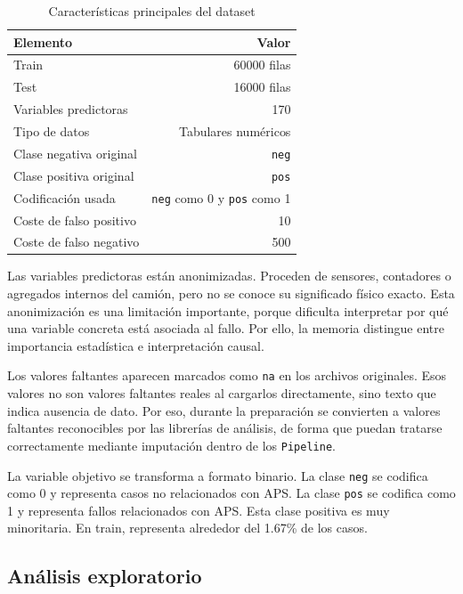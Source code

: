\documentclass[11pt,a4paper]{article}
\begin{document}
\begin{table}[H]
\centering
\caption{Características principales del dataset}
\label{tab_dataset}
\small
\begin{tabular}{@{}lr@{}}
\toprule
\textbf{Elemento} & \textbf{Valor}\\
\midrule
Train & 60000 filas\\
Test & 16000 filas\\
Variables predictoras & 170\\
Tipo de datos & Tabulares numéricos\\
Clase negativa original & \texttt{neg}\\
Clase positiva original & \texttt{pos}\\
Codificación usada & \texttt{neg} como 0 y \texttt{pos} como 1\\
Coste de falso positivo & 10\\
Coste de falso negativo & 500\\
\bottomrule
\end{tabular}
\end{table}

Las variables predictoras están anonimizadas. Proceden de sensores, contadores o agregados internos del camión, pero no se conoce su significado físico exacto. Esta anonimización es una limitación importante, porque dificulta interpretar por qué una variable concreta está asociada al fallo. Por ello, la memoria distingue entre importancia estadística e interpretación causal.

Los valores faltantes aparecen marcados como \texttt{na} en los archivos originales. Esos valores no son valores faltantes reales al cargarlos directamente, sino texto que indica ausencia de dato. Por eso, durante la preparación se convierten a valores faltantes reconocibles por las librerías de análisis, de forma que puedan tratarse correctamente mediante imputación dentro de los \texttt{Pipeline}.

La variable objetivo se transforma a formato binario. La clase \texttt{neg} se codifica como 0 y representa casos no relacionados con APS. La clase \texttt{pos} se codifica como 1 y representa fallos relacionados con APS. Esta clase positiva es muy minoritaria. En train, representa alrededor del 1.67\% de los casos.

\subsection{Análisis exploratorio}
\label{sec_eda}
\end{document}
